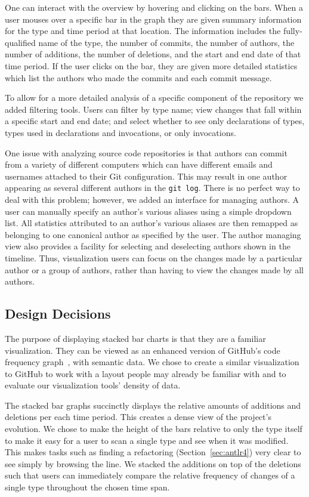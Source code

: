 One can interact with the overview by hovering and clicking on the bars. When a user mouses over a specific bar in the graph they are given summary information for the type and time period at that location. The information includes the fully-qualified name of the type, the number of commits, the number of authors, the number of additions, the number of deletions, and the start and end date of that time period. If the user clicks on the bar, they are given more detailed statistics which list the authors who made the commits and each commit message. 

To allow for a more detailed analysis of a specific component of the repository we added filtering tools. Users can filter by type name; view changes that fall within a specific start and end date; and select whether to see only declarations of types, types used in declarations and invocations, or only invocations.

One issue with analyzing source code repositories is that authors can commit from a variety of different computers which can have different emails and usernames attached to their Git configuration. This may result in one author appearing as several different authors in the \texttt{git log}. There is no perfect way to deal with this problem; however, we added an interface for managing authors. A user can manually specify an author's various aliases using a simple dropdown list. All statistics attributed to an author's various aliases are then remapped as belonging to one canonical author as specified by the user. The author managing view also provides a facility for selecting and deselecting authors shown in the timeline. Thus, visualization users can focus on the changes made by a particular author or a group of authors, rather than having to view the changes made by all authors.

\subsection{Design Decisions}

The purpose of displaying stacked bar charts is that they are a familiar visualization. They can be viewed as an enhanced version of GitHub's code frequency graph~\cite{github-graphs}, with semantic data. We chose to create a similar visualization to GitHub to work with a layout people may already be familiar with and to evaluate our visualization tools' density of data.

The stacked bar graphs succinctly displays the relative amounts of additions and deletions per each time period. This creates a dense view of the project's evolution. We chose to make the height of the bars relative to only the type itself to make it easy for a user to scan a single type and see when it was modified. This makes tasks such as finding a refactoring (Section~\ref{sec:antlr4}) very clear to see simply by browsing the line. We stacked the additions on top of the deletions such that users can immediately compare the relative frequency of changes of a single type throughout the chosen time span.

